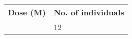 \begingroup\tiny
\begin{longtable}{p{2.5cm}p{2.5cm}}
  \hline
Dose (M) & No. of individuals \\ 
  \hline
 &   12 \\ 
   \hline
\hline
\end{longtable}
\endgroup
